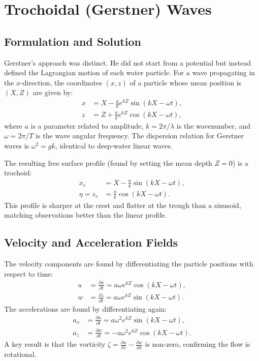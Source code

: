 \documentclass[11pt,a4paper]{article}
\begin{document}
\section{Trochoidal (Gerstner) Waves}
\subsection{Formulation and Solution}
Gerstner's approach was distinct. He did not start from a potential but instead defined the Lagrangian motion of each water particle. For a wave propagating in the $x$-direction, the coordinates $(x, z)$ of a particle whose mean position is $(X, Z)$ are given by:
\begin{align}
x &= X - \frac{a}{k} e^{kZ} \sin(kX - \omega t), \\
z &= Z + \frac{a}{k} e^{kZ} \cos(kX - \omega t),
\end{align}
where $a$ is a parameter related to amplitude, $k=2\pi/\lambda$ is the wavenumber, and $\omega=2\pi/T$ is the wave angular frequency. The dispersion relation for Gerstner waves is $\omega^2 = gk$, identical to deep-water linear waves.

The resulting free surface profile (found by setting the mean depth $Z=0$) is a trochoid:
\begin{align}
x_s &= X - \frac{a}{k} \sin(kX - \omega t), \\
\eta = z_s &= \frac{a}{k} \cos(kX - \omega t).
\end{align}
This profile is sharper at the crest and flatter at the trough than a sinusoid, matching observations better than the linear profile.

\subsection{Velocity and Acceleration Fields}
The velocity components are found by differentiating the particle positions with respect to time:
\begin{align}
u &= \frac{\partial x}{\partial t} = a \omega e^{kZ} \cos(kX - \omega t), \\
w &= \frac{\partial z}{\partial t} = a \omega e^{kZ} \sin(kX - \omega t).
\end{align}
The accelerations are found by differentiating again:
\begin{align}
a_x &= \frac{\partial u}{\partial t} = a \omega^2 e^{kZ} \sin(kX - \omega t), \\
a_z &= \frac{\partial w}{\partial t} = -a \omega^2 e^{kZ} \cos(kX - \omega t).
\end{align}
A key result is that the vorticity $\zeta = \frac{\partial u}{\partial z} - \frac{\partial w}{\partial x}$ is non-zero, confirming the flow is rotational.
\end{document}
